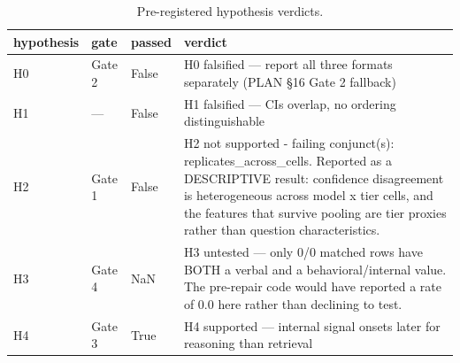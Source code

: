 \begin{table}
\caption{Pre-registered hypothesis verdicts.}
\label{tab:t15_hypothesis_verdicts}
\begin{tabular}{llll}
\toprule
hypothesis & gate & passed & verdict \\
\midrule
H0 & Gate 2 & False & H0 falsified — report all three formats separately (PLAN §16 Gate 2 fallback) \\
H1 & — & False & H1 falsified — CIs overlap, no ordering distinguishable \\
H2 & Gate 1 & False & H2 not supported - failing conjunct(s): replicates\_across\_cells. Reported as a DESCRIPTIVE result: confidence disagreement is heterogeneous across model x tier cells, and the features that survive pooling are tier proxies rather than question characteristics. \\
H3 & Gate 4 & NaN & H3 untested — only 0/0 matched rows have BOTH a verbal and a behavioral/internal value. The pre-repair code would have reported a rate of 0.0 here rather than declining to test. \\
H4 & Gate 3 & True & H4 supported — internal signal onsets later for reasoning than retrieval \\
\bottomrule
\end{tabular}
\end{table}
